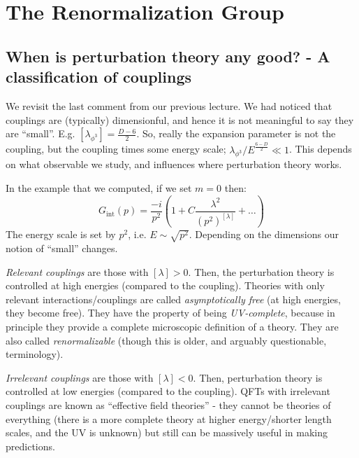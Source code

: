 \section{The Renormalization Group}
\subsection{When is perturbation theory any good? - A classification of couplings}
We revisit the last comment from our previous lecture. We had noticed that couplings are (typically) dimensionful, and hence it is not meaningful to say they are ``small''. E.g. $[\lambda_{\phi^3}] = \frac{D-6}{2}$. So, really the expansion parameter is not the coupling, but the coupling times some energy scale; $\lambda_{\phi^3}/E^{\frac{6-D}{2}} \ll 1$. This depends on what observable we study, and influences where perturbation theory works.

In the example that we computed, if we set $m = 0$ then:
\begin{equation}
    G_{\text{int}}(p) = \frac{-i}{p^2}\left(1 + C\frac{\lambda^2}{(p^2)^{[\lambda]}} + \ldots\right)
\end{equation}
The energy scale is set by $p^2$, i.e. $E \sim \sqrt{p^2}$. Depending on the dimensions our notion of ``small'' changes.

\emph{Relevant couplings} are those with $[\lambda] > 0$. Then, the perturbation theory is controlled at high energies (compared to the coupling). Theories with only relevant interactions/couplings are called \emph{asymptotically free} (at high energies, they become free). They have the property of being \emph{UV-complete}, because in principle they provide a complete microscopic definition of a theory. They are also called \emph{renormalizable} (though this is older, and arguably questionable, terminology).

\emph{Irrelevant couplings} are those with $[\lambda] < 0$. Then, perturbation theory is controlled at low energies (compared to the coupling). QFTs with irrelevant couplings are known as ``effective field theories'' - they cannot be theories of everything (there is a more complete theory at higher energy/shorter length scales, and the UV is unknown) but still can be massively useful in making predictions.

